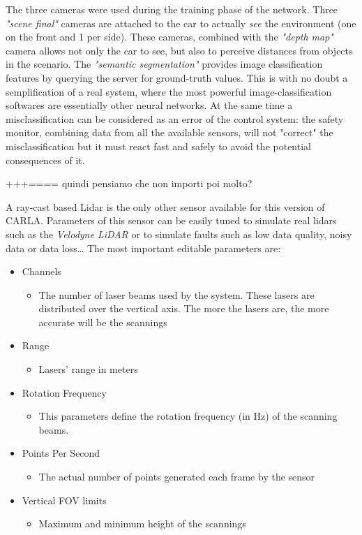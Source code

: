 The three cameras were used during the training phase of the network. Three \textsl{"scene final"} cameras are attached to the car to actually \textsl{see} the environment (one on the front and 1 per side). These cameras, combined with the \textsl{"depth map"} camera allows not only the car to see, but also to perceive distances from objects in the scenario.
The \textsl{"semantic segmentation"} provides image classification features by querying the server for ground-truth values. This is with no doubt a semplification of a real system, where the most powerful image-classification softwares are essentially other neural networks. At the same time a misclassification can be considered as an error of the control system: the safety monitor, combining data from all the available sensors, will not "correct" the misclassification but it must react fast and safely to avoid the potential consequences of it.

+++====    quindi pensiamo che non importi poi molto?

A ray-cast based Lidar is the only other sensor available for this version of CARLA. Parameters of this sensor can be easily tuned to simulate real lidars such as the \textsl{Velodyne LiDAR} or to simulate faults such as low data quality, noisy data or data loss\dots
The most important editable parameters are:

\begin{itemize}
	\item Channels
	\begin{itemize}
		\item The number of laser beams used by the system. These lasers are distributed over the vertical axis. The more the lasers are, the more accurate will be the scannings
	\end{itemize}
	\item Range
	\begin{itemize}
		\item Lasers' range in meters
	\end{itemize}
	\item Rotation Frequency
	\begin{itemize}
		\item This parameters define the rotation frequency (in Hz) of the scanning beams.
	\end{itemize}
	\item Points Per Second
	\begin{itemize}
		\item The actual number of points generated each frame by the sensor
	\end{itemize}
	\item Vertical FOV limits
	\begin{itemize}
		\item Maximum and minimum height of the scannings
	\end{itemize}
	
\end{itemize}


